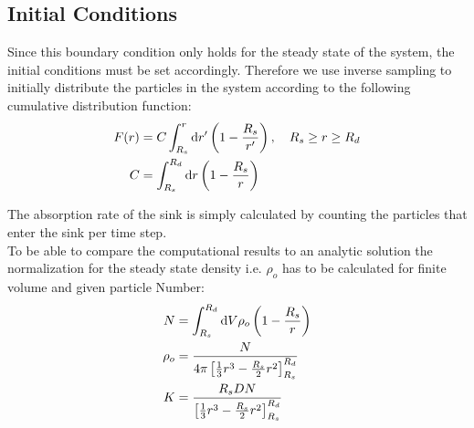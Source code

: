 \subsection{Initial Conditions}
Since this boundary condition only holds for the steady state of the system, the initial conditions must be set accordingly. Therefore we use inverse sampling to initially distribute the particles in the system according to the following cumulative distribution function:
\begin{align}
    F(r) &= C \int_{R_s}^{r} {\rm d} r' \left( 1 - \frac{R_s}{r'} \right), \quad R_s \ge r \ge R_d \\
    C    &= \int_{R_s}^{R_d} {\rm d} r \left( 1 - \frac{R_s}{r} \right)
    \label{CDF}
\end{align}

The absorption rate of the sink is simply calculated by counting the particles that enter the sink per time step. \\
To be able to compare the computational results to an analytic solution the normalization for the steady state density i.e. $\rho_o$ has to be calculated for finite volume and given particle Number:
\begin{align}
    N &= \int_{R_s}^{R_d} {\rm d} V \rho_o \left( 1 - \frac{R_s}{r} \right) \\
    \rho_o &= \frac{N}{4 \pi \left[ \frac{1}{3}r^{3} - \frac{R_s}{2}r^{2} \right]_{R_s}^{R_d}} \\
    K &= \frac{R_s D N}{  \left[ \frac{1}{3}r^{3} - \frac{R_s}{2}r^{2} \right]_{R_s}^{R_d}}
    \label{normalization}
\end{align}

